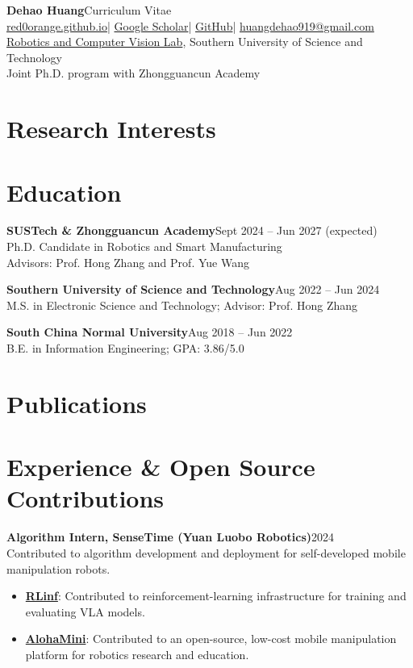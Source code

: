 \documentclass[11pt,a4paper]{article}
\begin{document}
{\LARGE\bfseries\color{ink}Dehao Huang}\hfill{\small Curriculum Vitae}\\[4pt]
\href{https://red0orange.github.io}{red0orange.github.io}\enspace | \enspace
\href{https://scholar.google.com/citations?user=AESnhwIAAAAJ&hl=en}{Google Scholar}\enspace | \enspace
\href{https://github.com/red0orange}{GitHub}\enspace | \enspace
\href{mailto:huangdehao919@gmail.com}{huangdehao919@gmail.com}\\[2pt]
\href{https://rcvlab.eee.sustech.edu.cn/}{Robotics and Computer Vision Lab}, Southern University of Science and Technology\\
Joint Ph.D. program with Zhongguancun Academy

\section*{Research Interests}


\section*{Education}
\textbf{SUSTech \& Zhongguancun Academy}\hfill Sept 2024 -- Jun 2027 (expected)\\
Ph.D. Candidate in Robotics and Smart Manufacturing\\
Advisors: Prof. Hong Zhang and Prof. Yue Wang

\textbf{Southern University of Science and Technology}\hfill Aug 2022 -- Jun 2024\\
M.S. in Electronic Science and Technology; Advisor: Prof. Hong Zhang

\textbf{South China Normal University}\hfill Aug 2018 -- Jun 2022\\
B.E. in Information Engineering; GPA: 3.86/5.0

\section*{Publications}


\section*{Experience \& Open Source Contributions}
\textbf{Algorithm Intern, SenseTime (Yuan Luobo Robotics)}\hfill 2024\\
Contributed to algorithm development and deployment for self-developed mobile manipulation robots.
\begin{itemize}
\item \textbf{\href{https://github.com/RLinf/RLinf}{RLinf}}: Contributed to reinforcement-learning infrastructure for training and evaluating VLA models.
\item \textbf{\href{https://github.com/liyiteng/AlohaMini}{AlohaMini}}: Contributed to an open-source, low-cost mobile manipulation platform for robotics research and education.
\end{itemize}
\end{document}
